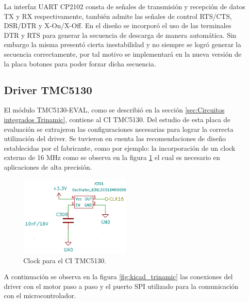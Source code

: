 La interfaz UART CP2102 consta de señales de transmisión y recepción de datos TX y RX respectivamente, también admite las señales de control RTS/CTS, DSR/DTR y X-On/X-Off. En el diseño se incorporó el uso de las terminales DTR y RTS para generar la secuencia de descarga de manera automática. Sin embargo la misma presentó cierta inestabilidad y no siempre se logró generar la secuencia correctamente, por tal motivo se implementará en la nueva versión de la placa botones para poder forzar dicha secuencia.



\subsection{Driver TMC5130}

El módulo TMC5130-EVAL, como se describió en la sección \ref{sec:Circuitos integrados Trinamic}, contiene al CI TMC5130. Del estudio de esta placa de evaluación se extrajeron las configuraciones necesarias para lograr la correcta utilización del driver. Se tuvieron en cuenta las recomendaciones de diseño establecidas por el fabricante, como por ejemplo: la incorporación de un clock externo de 16 MHz como se observa en la figura \ref{fig:kicad_clock} el cual es necesario en aplicaciones de alta precisión. 

\begin{figure}[!h]
	\centering
	\includegraphics[width=0.5\textwidth]{./Figures/kicad_clock.png}
	\caption{Clock para el CI TMC5130.}
	\label{fig:kicad_clock}
\end{figure}

A continuación se observa en la figura \ref{fig:kicad_trinamic} las conexiones del driver con el motor paso a paso y el puerto SPI utilizado para la comunicación con el microcontrolador. 
 
